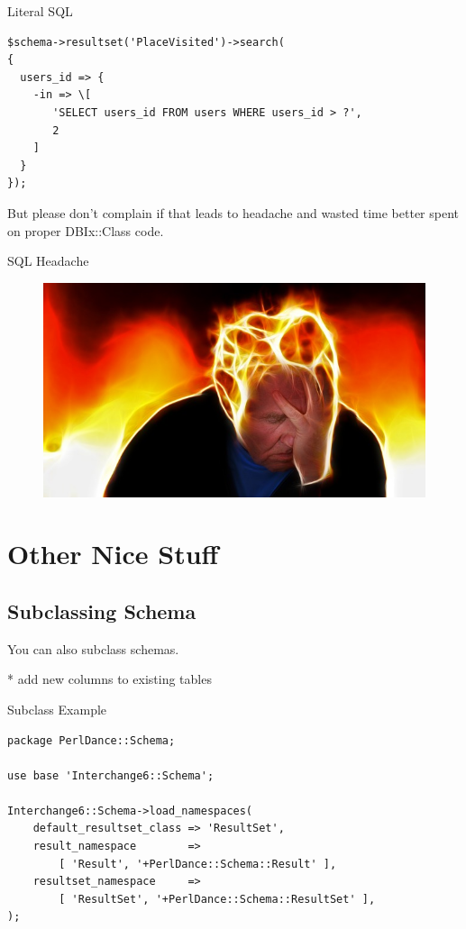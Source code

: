 \begin{frame}[fragile]{Literal SQL}
\begin{lstlisting}
$schema->resultset('PlaceVisited')->search(
{
  users_id => {
    -in => \[
       'SELECT users_id FROM users WHERE users_id > ?',
       2
    ]
  }
});
\end{lstlisting}
\end{frame}

But please don't complain if that leads to headache
and wasted time better spent on proper DBIx::Class
code.

\begin{frame}{SQL Headache}
\begin{figure}[!ht]
\centering
\includegraphics[width=1\linewidth]{img/stress.jpg}
\end{figure}
\end{frame}

\section{Other Nice Stuff}
\subsection{Subclassing Schema}

You can also subclass schemas.

* add new columns to existing tables

\begin{frame}[fragile]{Subclass Example}
\begin{lstlisting}
package PerlDance::Schema;

use base 'Interchange6::Schema';

Interchange6::Schema->load_namespaces(
    default_resultset_class => 'ResultSet',
    result_namespace        =>
        [ 'Result', '+PerlDance::Schema::Result' ],
    resultset_namespace     =>
        [ 'ResultSet', '+PerlDance::Schema::ResultSet' ],
);
\end{lstlisting}
\end{frame}

